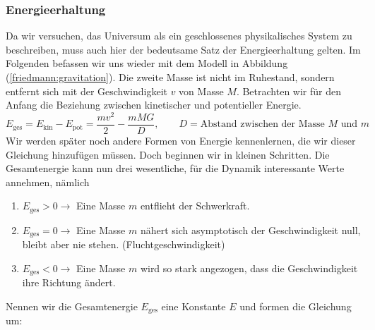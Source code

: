 \begin{refsection}
\subsubsection{Energieerhaltung}
Da wir versuchen, das Universum als ein geschlossenes physikalisches System zu beschreiben, muss auch hier der bedeutsame Satz der Energieerhaltung gelten. Im Folgenden befassen wir uns wieder mit dem Modell in Abbildung (\ref{friedmann:gravitation}). Die zweite Masse ist nicht im Ruhestand, sondern entfernt sich mit der Geschwindigkeit $v$ von Masse $M$. Betrachten wir für den Anfang die Beziehung zwischen kinetischer und potentieller Energie.
\begin{equation}
E_{\text{ges}} = E_{\text{kin}} - E_{\text{pot}} =  \frac{m v^2}{2} - \frac{m M G }{D}, \qquad D = \text{Abstand zwischen der Masse $M$ und $m$}
\end{equation}
Wir werden später noch andere Formen von Energie kennenlernen, die wir dieser Gleichung hinzufügen müssen. Doch beginnen wir in kleinen Schritten. Die Gesamtenergie kann nun drei wesentliche, für die Dynamik interessante Werte annehmen, nämlich
\begin{enumerate}
	\item $E_{\text{ges}} > 0 \rightarrow$ Eine Masse $m$ entflieht der Schwerkraft.
	\item $E_{\text{ges}} = 0 \rightarrow$ Eine Masse $m$ nähert sich asymptotisch  der Geschwindigkeit null, bleibt aber nie stehen. (Fluchtgeschwindigkeit)
	\item $E_{\text{ges}} < 0 \rightarrow$ Eine Masse $m$ wird so stark angezogen, dass die Geschwindigkeit ihre Richtung ändert.
\end{enumerate}
Nennen wir die Gesamtenergie $E_{\text{ges}}$ eine Konstante $E$ und formen die Gleichung um:


\end{refsection}
